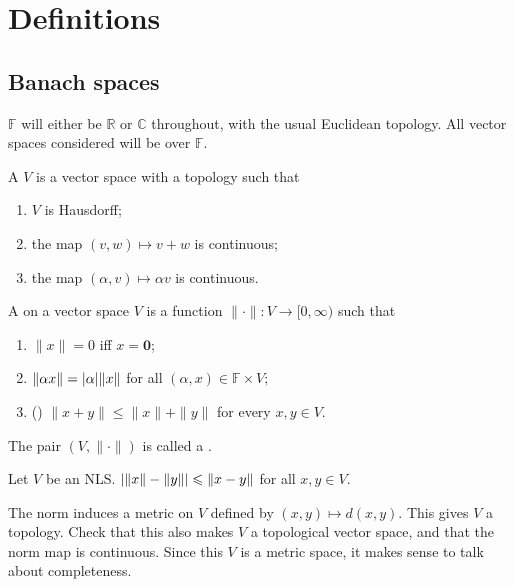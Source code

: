 \documentclass[12pt]{article}	%
\begin{document}
\coverpage

\updated{\today}

\thispagestyle{empty}
\tableofcontents
\newpage
\pagestyle{fancy}
\setcounter{page}{1}

\section{Definitions} 

\subsection{Banach spaces}

$\mathbb{F}$ will either be $\mathbb{R}$ or $\mathbb{C}$ throughout, with the usual Euclidean topology. All vector spaces considered will be over $\mathbb{F}$.

\begin{defn}
 	A  $V$ is a vector space with a topology such that
 	\begin{enumerate}
 		\item $V$ is Hausdorff;
 		\item the map $(v, w) \mapsto v + w$ is continuous;
 		\item the map $(\alpha, v) \mapsto \alpha v$ is continuous.
 	\end{enumerate}
\end{defn} 

\begin{defn}
	A  on a vector space $V$ is a function $\|\cdot\| : V \to [0, \infty)$ such that
	\begin{enumerate}
		\item $\|x\| = 0$ iff $x = \mathbf{0}$;
		\item $\|\alpha x\| = {\left\lvert \alpha \right\lvert} \|x\|$ for all $(\alpha, x) \in \mathbb{F} \times V$;
		\item () $\|x + y\| \le \|x\| + \|y\|$ for every $x, y \in V$.
	\end{enumerate}
	The pair $(V, \|\cdot\|)$ is called a .
\end{defn}

\begin{prop}
	Let $V$ be an NLS. ${\left\lvert \|x\| - \|y\| \right\lvert} \leqslant \|x - y\|$ for all $x, y \in V$.
\end{prop}

The norm induces a metric on $V$ defined by $(x, y) \mapsto d(x, y)$. This gives $V$ a topology. Check that this also makes $V$ a topological vector space, and that the norm map is continuous. Since this $V$ is a metric space, it makes sense to talk about completeness.
\end{document}
